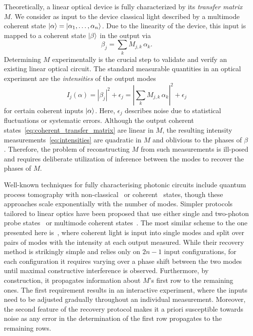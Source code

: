 Theoretically, a linear optical device is fully characterized by its \emph{transfer matrix} ${M}$.
We consider as input to the device classical light described by a multimode coherent state $\ket{{\alpha}} = \ket{\alpha_1, \ldots, \alpha_n}$.
Due to the linearity of the device, this input is mapped to a coherent state $\ket{{\beta}}$ in the output via
\begin{equation}
  \beta_j = \sum_k M_{j,k} \,\alpha_k.
  \label{eq:coherent_transfer_matrix}
\end{equation}
Determining ${M}$ experimentally is the crucial step to validate and verify an existing linear optical circuit.
The standard measurable quantities in an optical experiment are the \emph{intensities} of the output modes
\begin{equation}
  I_j({\alpha})
  = \left| \beta_j \right|^2 + \epsilon_j
  = \left| \sum_k M_{j,k} \, \alpha_k \right|^2 + \epsilon_j
  \label{eq:intensities}
\end{equation}
for certain coherent inputs $\ket{{\alpha}}$.
Here, $\epsilon_j$ describes noise due to statistical fluctuations or systematic errors.
Although the output coherent states~\eqref{eq:coherent_transfer_matrix} are linear in ${M}$, the resulting intensity measurements~\eqref{eq:intensities} are quadratic in ${M}$ and oblivious to the phases of $\beta$.
Therefore, the problem of reconstructing ${M}$ from such measurements is ill-posed and requires deliberate utilization of inference between the modes to recover the phases of $M$.

Well-known techniques for fully characterising photonic circuits include quantum process tomography with non-classical~\cite{OBrien2004} or coherent~\cite{rahimi-keshari_quantum_2011} states, though these approaches scale exponentially with the number of modes.
Simpler protocols tailored to linear optics have been proposed that use either single and two-photon probe states~\cite{laing_super-stable_2012,Dhand2016,Spagnolo2017} or multimode coherent states~\cite{rahimi_direct_2013,Tillmann2016}.
The most similar scheme to the one presented here is~\cite{rahimi_direct_2013}, where coherent light is input into single modes and split over pairs of modes with the intensity at each output measured.
While their recovery method is strikingly simple and relies only on $2n-1$ input configurations, for each configuration it requires varying over a phase shift between the two modes until maximal constructive interference is observed.
Furthermore, by construction, it propagates information about ${M}$'s first row to the remaining ones.
The first requirement results in an interactive experiment, where the inputs need to be adjusted gradually throughout an individual measurement.
Moreover, the second feature of the recovery protocol makes it a priori susceptible towards noise as any error in the determination of the first row propagates to the remaining rows.




